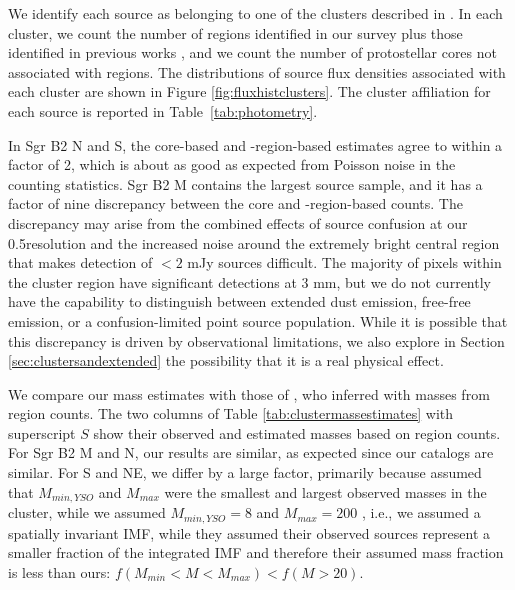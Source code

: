 \documentclass[twocolumn]{aastex61}
\begin{document}

We identify each source as belonging to one of the clusters described in
\citet[][see Figure \ref{fig:overview}]{Schmiedeke2016a}. In each cluster, we
count the number of \hii regions identified in our survey plus those identified
in previous works \citep{Gaume1995a,De-Pree1996a}, and we count the number of
protostellar cores not associated with \hii regions.  The distributions of
source flux densities associated with each cluster are shown in Figure
\ref{fig:fluxhistclusters}.  The cluster affiliation for each source is
reported in Table~\ref{tab:photometry}.

In Sgr B2 N and S, the core-based
and \hii-region-based estimates agree to within a factor of 2, which is about
as good as expected from Poisson noise in the counting statistics.  
Sgr B2 M contains the largest source sample, and it has a factor of nine
discrepancy between the core and \hii-region-based counts. The discrepancy
may arise from the combined effects of source
confusion at our 0.5\arcsec resolution and the increased noise around the
extremely bright central region that makes detection of $<2$ mJy sources
difficult.  The majority of pixels within the cluster region have significant
detections at 3 mm, but we do not currently have the capability to distinguish
between extended dust emission, free-free emission, or a confusion-limited
point source population.  While it is possible that this discrepancy
is driven by observational limitations, we also explore in Section
\ref{sec:clustersandextended} the possibility that it is a real physical
effect.

We compare our mass estimates with those of \citet{Schmiedeke2016a}, who inferred
with masses from \hii region counts.  The  two columns of Table
\ref{tab:clustermassestimates} with superscript $S$ show their observed and
estimated masses based on
\hii region counts.  For Sgr B2 M and N, our results are similar, as expected
since our catalogs are similar.  For S and NE, we differ by a large factor,
primarily because \citet{Schmiedeke2016a} assumed that $M_{min,YSO}$ and $M_{max}$
were the smallest and largest observed masses in the cluster, while we assumed
$M_{min,YSO}=8$ \msun and $M_{max}=200$ \msun, i.e., we assumed a spatially
invariant IMF, while they assumed their observed sources represent a smaller
fraction of the integrated IMF and therefore their assumed mass fraction is
less than ours: $f(M_{min}< M < M_{max}) < f(M>20)$.


\end{document}
